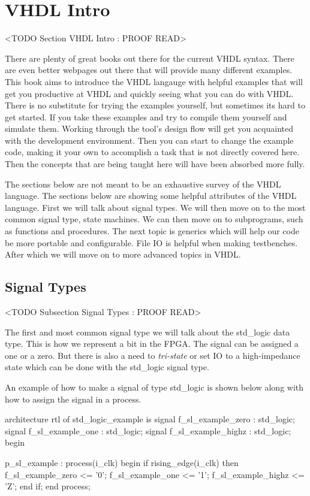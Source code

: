 \section{VHDL Intro}
	<TODO Section VHDL Intro : PROOF READ>
	
There are plenty of great books out there for the current \ac{VHDL} syntax. There are even better webpages out there that will provide many different examples. This book aims to introduce the \ac{VHDL} langauge with helpful examples that will get you productive at \ac{VHDL} and quickly seeing what you can do with \ac{VHDL}. There is no substitute for trying the examples yourself, but sometimes its hard to get started. If you take these examples and try to compile them yourself and simulate them. Working through the tool's design flow will get you acquainted with the development environment. Then you can start to change the example code, making it your own to accomplish a task that is not directly covered here. Then the concepts that are being taught here will have been absorbed more fully.

The sections below are not meant to be an exhaustive survey of the \ac{VHDL} language. The sections below are showing some helpful attributes of the \ac{VHDL} language. First we will talk about signal types. We will then move on to the most common signal type, state machines. We can then move on to subprograms, such as functions and procedures. The next topic is generics which will help our code be more portable and configurable. File \ac{IO} is helpful when making testbenches. After which we will move on to more advanced topics in \ac{VHDL}.

\subsection{Signal Types}
	<TODO Subsection Signal Types : PROOF READ>

The first and most common signal type we will talk about the std\_logic data type. This is how we represent a bit in the \ac{FPGA}. The signal can be assigned a one or a zero. But there is also a need to \emph{tri-state} or set \ac{IO} to a high-impedance state which can be done with the std\_logic signal type. 

An example of how to make a signal of type std\_logic is shown below along with how to assign the signal in a process.

\begin{VHDLlisting}[tabsize=8]
architecture rtl of std_logic_example is
	signal f_sl_example_zero     : std_logic;
	signal f_sl_example_one      : std_logic;
	signal f_sl_example_highz    : std_logic;
begin

p_sl_example : process(i_clk)
begin
	if rising_edge(i_clk) then
		f_sl_example_zero  <= '0';
		f_sl_example_one   <= '1';
		f_sl_example_highz <= 'Z';
	end if;
end process;
\end{VHDLlisting}

